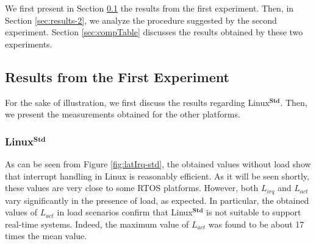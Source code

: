 \documentclass{acm_proc_article-sp}
\begin{document}
We first present in Section \ref{sec:results-1} the results from the first
experiment.  Then, in Section \ref{sec:results-2}, we analyze the procedure
suggested by the second experiment. Section \ref{sec:compTable} discusses the
results obtained by these two experiments.
\newline

\subsection{Results from the First Experiment}
\label{sec:results-1}

For the sake of illustration, we first discuss the results regarding
Linux$^\mathbf{Std}$.  Then, we present the measurements obtained for the other
platforms.

\subsubsection{Linux$^\mathbf{Std}$}

As can be seen from Figure \ref{fig:latIrq-std}, the obtained values without load
show that interrupt handling in Linux is reasonably efficient. As it will be seen
shortly, these values are very close to some RTOS platforms.  However, both
$L_{irq}$ and $L_{act}$ vary significantly in the presence of load, as
expected.  In particular, the obtained values of $L_{act}$ in load scenarios
confirm that Linux$^\mathbf{Std}$ is not suitable to support real-time systems.
Indeed, the maximum value of $L_{act}$ was found to be about 17 times the mean value.

\begin{figure*}[t!]%
  \hspace{10pt}%
   
  \hspace{10pt}%
   
 \caption[Linux$^{\mathbf{Std}}$ latencies]{Linux$^{\mathbf{Std}}$ latencies.  The
   $eth_0$ interrupt handler is triggered by packets arriving at a $20 Hz$ frequency.}
 \label{fig:latIrq-std}%
\end{figure*}
\end{document}
